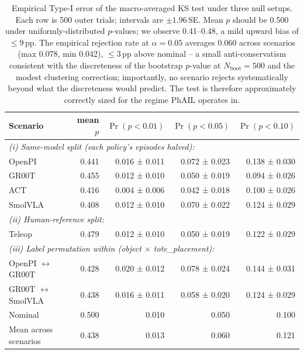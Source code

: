 \documentclass{article}
\begin{document}
\begin{table}[!h]
\centering
\small
\begin{tabular}{lrrrr}
\toprule
Scenario & mean $p$ & $\Pr(p{<}0.01)$ & $\Pr(p{<}0.05)$ & $\Pr(p{<}0.10)$ \\
\midrule
\multicolumn{5}{l}{\emph{(i) Same-model split (each policy's episodes halved):}} \\
\quad OpenPI   & 0.441 & 0.016 ± 0.011 & 0.072 ± 0.023 & 0.138 ± 0.030 \\
\quad GR00T    & 0.455 & 0.012 ± 0.010 & 0.050 ± 0.019 & 0.094 ± 0.026 \\
\quad ACT      & 0.416 & 0.004 ± 0.006 & 0.042 ± 0.018 & 0.100 ± 0.026 \\
\quad SmolVLA  & 0.408 & 0.012 ± 0.010 & 0.070 ± 0.022 & 0.124 ± 0.029 \\
\midrule
\multicolumn{5}{l}{\emph{(ii) Human-reference split:}} \\
\quad Teleop   & 0.479 & 0.012 ± 0.010 & 0.050 ± 0.019 & 0.122 ± 0.029 \\
\midrule
\multicolumn{5}{l}{\emph{(iii) Label permutation within (object $\times$ tote\_placement):}} \\
\quad OpenPI $\leftrightarrow$ GR00T   & 0.428 & 0.020 ± 0.012 & 0.078 ± 0.024 & 0.144 ± 0.031 \\
\quad GR00T $\leftrightarrow$ SmolVLA  & 0.438 & 0.016 ± 0.011 & 0.058 ± 0.020 & 0.124 ± 0.029 \\
\midrule
Nominal      & 0.500 & 0.010         & 0.050         & 0.100         \\
Mean across scenarios  & 0.438 & 0.013 & 0.060 & 0.121 \\
\bottomrule
\end{tabular}
\caption{Empirical Type-I error of the macro-averaged KS test under three null setups. Each row is 500 outer trials; intervals are $\pm 1.96$\,SE. Mean $p$ should be 0.500 under uniformly-distributed $p$-values; we observe 0.41--0.48, a mild upward bias of $\le 9\,\text{pp}$. The empirical rejection rate at $\alpha{=}0.05$ averages 0.060 across scenarios (max 0.078, min 0.042), $\le 3\,\text{pp}$ above nominal -- a small anti-conservatism consistent with the discreteness of the bootstrap $p$-value at $N_\text{boot}{=}500$ and the modest clustering correction; importantly, no scenario rejects systematically beyond what the discreteness would predict. The test is therefore approximately correctly sized for the regime PhAIL operates in.}
\label{tab:nullcal}
\end{table}
\end{document}
